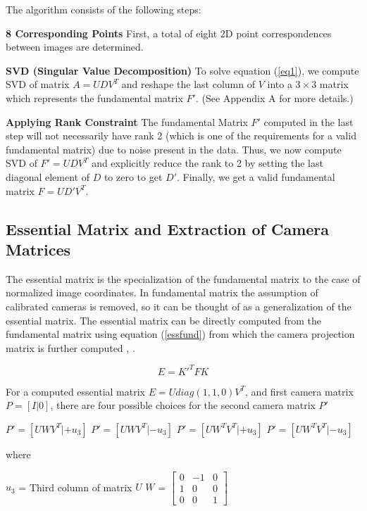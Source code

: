 \documentclass[11pt, a4paper, openany]{article}
\begin{document}
The algorithm consists of the following steps:
\begin{description}
\item \textbf{8 Corresponding Points} First, a total of eight 2D point correspondences between images are determined.

\item \textbf{SVD (Singular Value Decomposition)} To solve equation (\ref{eq1}), we compute SVD of matrix $A = UDV^{T}$ and reshape the last column of $V$ into a $3\times3$ matrix which represents the fundamental matrix $F'$. (See Appendix A for more details.)

\item \textbf{Applying Rank Constraint} The fundamental Matrix $F'$ computed in the last step will not necessarily have rank 2 (which is one of the requirements for a valid fundamental matrix) due to noise present in the data. Thus, we now compute SVD of $F' = UDV^{T}$ and explicitly reduce the rank to 2 by setting the last diagonal element of $D$ to zero to get $D'$. Finally, we get a valid fundamental matrix $F = UD'V^{T}$.
\end{description}

\subsection{Essential Matrix and Extraction of Camera Matrices} The essential matrix is the specialization of the fundamental matrix to the case of normalized image coordinates. In fundamental matrix the assumption of calibrated cameras is removed, so it can be thought of as a generalization of the essential matrix. The essential matrix can be directly computed from the fundamental matrix using equation (\ref{essfund}) from which the camera projection matrix is further computed \cite{section 9.6}, \cite{pose estimation}.

\begin{equation}\label{essfund}
E = K'^{T}FK
\end{equation}

For a computed essential matrix $E = U diag(1, 1, 0)V^{T}$, and first camera matrix $P = [ I | 0 ]$, there are four possible choices for the second camera matrix $P'$
\begin{center}
$P' = [UWV^{T}| + u_{3}]$\newline
$P' = [UWV^{T}| - u_{3}]$\newline
$P' = [UW^{T}V^{T}| + u_{3}]$\newline
$P' = [UW^{T}V^{T}| - u_{3}]$\newline
\end{center}
where
\begin{center}
$u_{3}$ = Third column of matrix $U$\newline
$W$ = $\begin{bmatrix}
0 & -1 & 0\\
1 & 0 & 0\\
0 & 0 & 1
\end{bmatrix}$ \newline
\end{center}
\end{document}
